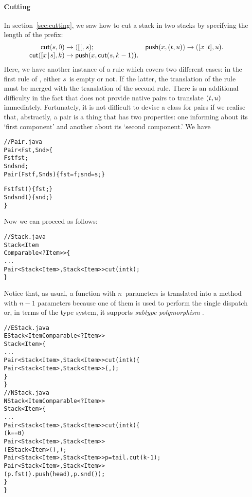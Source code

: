 \paragraph{Cutting}

In section~\vref{sec:cutting}, we saw how to cut a stack in two stacks
by specifying the length of the prefix:
\begin{equation*}
\begin{array}{@{}r@{\;}l@{\;}lr@{\;}l@{\;}l@{}}
\fun{cut}(s,0) & \rightarrow & \pair{\el}{s};
& \fun{push}(x,\pair{t}{u}) & \rightarrow & \pair{\cons{x}{t}}{u}.\\
\fun{cut}(\cons{x}{s},k) & \rightarrow
& \fun{push}(x,\fun{cut}(s,k-1)).
\end{array}
\end{equation*}
Here, we have another instance of a rule which covers two different
cases: in the first rule of , either \(s\)~is empty or
not. If the latter, the translation of the rule must be merged with
the translation of the second rule. There is an additional difficulty
in the fact that \Java does not provide native pairs to translate
\(({t},{u})\) immediately. Fortunately, it is not difficult to
devise a class for pairs if we realise that, abstractly, a pair is a
thing that has two properties: one informing about its `first
component' and another about its `second component.' We have
\begin{alltt}
// Pair.java
\public \class Pair<Fst,Snd> \{
  \protectedX \final Fst fst;
  \protectedX \final Snd snd;
  \public Pair(\final Fst f, \final Snd s) \{fst = f; snd = s;\}

  \public Fst fst() \{ \return fst; \}
  \public Snd snd() \{ \return snd; \}
\}
\end{alltt}
Now we can proceed as follows:
\begin{alltt}
// Stack.java
\public \abstractX \class Stack<Item
\hfill\extends Comparable<? \super Item>> \{
  ...
  \public \abstractX
            Pair<Stack<Item>,Stack<Item>> cut(\final int k);
\}
\end{alltt}
Notice that, as usual, a function with \(n\)~parameters is translated
into a method with \(n-1\) parameters because one of them is used to
perform the single dispatch or, in terms of the type system, it
supports \emph{subtype polymorphism} \citep{Pierce_2002}.
\begin{alltt}
// EStack.java
\public \class EStack<Item \extends Comparable<? \super Item>>
       \extends Stack<Item> \{
  ...
  \public Pair<Stack<Item>,Stack<Item>> cut(\final int k) \{
    \return \new Pair<Stack<Item>,Stack<Item>>(\this,\this);
  \}
\}
// NStack.java
\public \class NStack<Item \extends Comparable<? \super Item>>
       \extends Stack<Item> \{
  ...
  \public Pair<Stack<Item>,Stack<Item>> cut(\final int k) \{
    \ifX (k == 0)
       \return \new Pair<Stack<Item>,Stack<Item>>
                      (\new EStack<Item>(),\this);
    Pair<Stack<Item>,Stack<Item>> p = tail.cut(k-1);
    \return \new Pair<Stack<Item>,Stack<Item>>
                   (p.fst().push(head),p.snd());
  \}
\}
\end{alltt}
